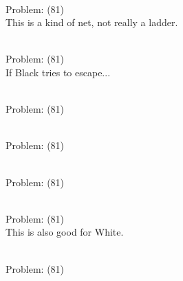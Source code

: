 \documentclass[11pt]{article}
\begin{document}
\begin{minipage}[t]{0.5\textwidth}
  {\centering
  
\\
Problem: (81)\\
This is a kind of net, not really a ladder.\\
  }
\end{minipage}
\begin{minipage}[t]{0.5\textwidth}
  {\centering
  
\\
Problem: (81)\\
If Black tries to escape...\\
  }
\end{minipage}
\begin{minipage}[t]{0.5\textwidth}
  {\centering
  
\\
Problem: (81)\\
  }
\end{minipage}
\begin{minipage}[t]{0.5\textwidth}
  {\centering
  
\\
Problem: (81)\\
  }
\end{minipage}
\begin{minipage}[t]{0.5\textwidth}
  {\centering
  
\\
Problem: (81)\\
  }
\end{minipage}
\begin{minipage}[t]{0.5\textwidth}
  {\centering
  
\\
Problem: (81)\\
This is also good for White.\\
  }
\end{minipage}
\begin{minipage}[t]{0.5\textwidth}
  {\centering
  
\\
Problem: (81)\\
  }
\end{minipage}
\end{document}
